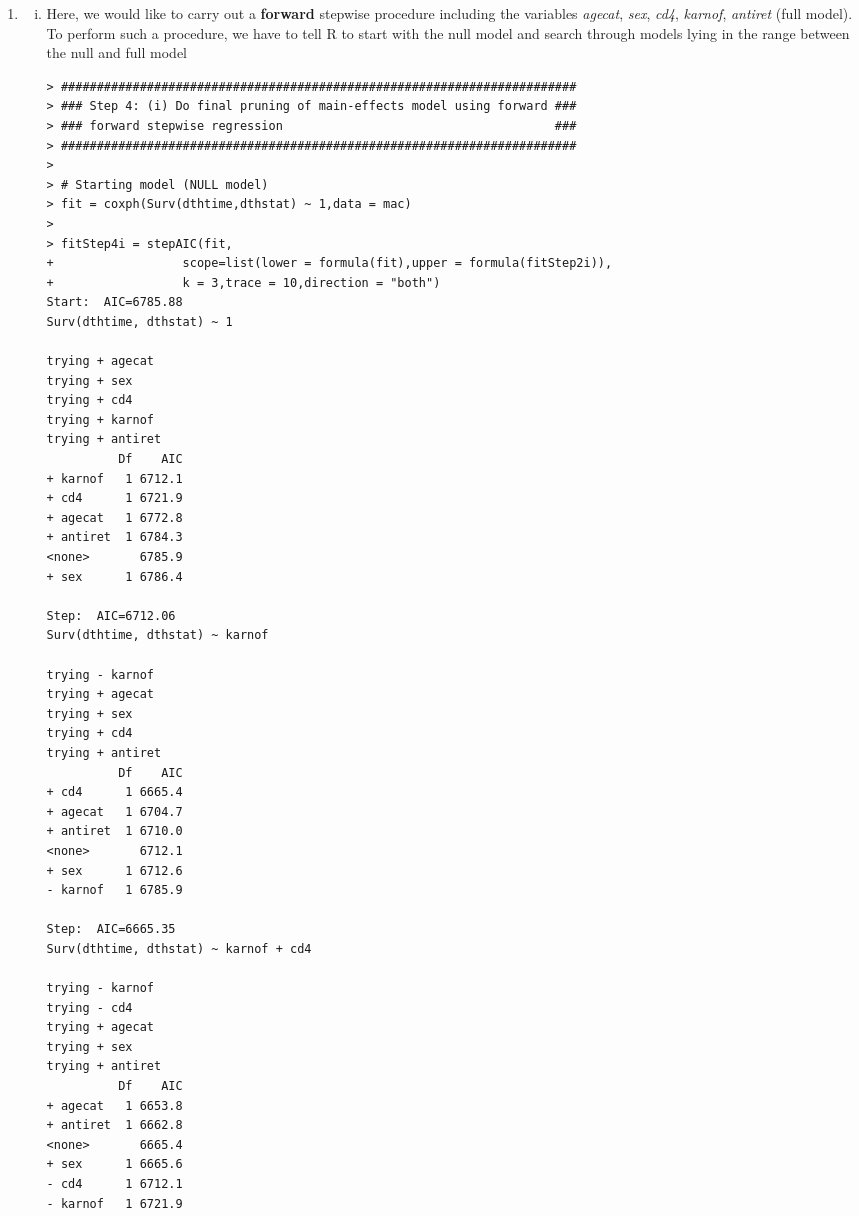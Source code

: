 \begin{enumerate}[(a)]
\begin{enumerate}[Step 1:]
\begin{spacing}{1.2}
\begin{footnotesize}
\begin{verbatim}
trying + ivdrug
trying + trt
         Df    AIC
<none>      6650.9
+ ivdrug  1 6653.5
+ trt     2 6656.3
\end{verbatim}
\end{footnotesize}
\end{spacing}
There is no variable added in the model.
\item \begin{enumerate}[(i)]
\item Here, we would like to carry out a \textbf{forward} stepwise procedure including the variables \emph{agecat}, \emph{sex}, \emph{cd4}, \emph{karnof}, \emph{antiret} (full model). To perform such a procedure, we have to tell R to start with the null model and search through models lying in the
range between the null and full model
\begin{spacing}{1.2}
\begin{footnotesize}
\begin{verbatim}
> ########################################################################
> ### Step 4: (i) Do final pruning of main-effects model using forward ###        
> ### forward stepwise regression                                      ###                           
> ########################################################################
> 
> # Starting model (NULL model)
> fit = coxph(Surv(dthtime,dthstat) ~ 1,data = mac)
> 
> fitStep4i = stepAIC(fit,
+                  scope=list(lower = formula(fit),upper = formula(fitStep2i)),
+                  k = 3,trace = 10,direction = "both")
Start:  AIC=6785.88
Surv(dthtime, dthstat) ~ 1

trying + agecat
trying + sex
trying + cd4
trying + karnof
trying + antiret
          Df    AIC
+ karnof   1 6712.1
+ cd4      1 6721.9
+ agecat   1 6772.8
+ antiret  1 6784.3
<none>       6785.9
+ sex      1 6786.4

Step:  AIC=6712.06
Surv(dthtime, dthstat) ~ karnof

trying - karnof
trying + agecat
trying + sex
trying + cd4
trying + antiret
          Df    AIC
+ cd4      1 6665.4
+ agecat   1 6704.7
+ antiret  1 6710.0
<none>       6712.1
+ sex      1 6712.6
- karnof   1 6785.9

Step:  AIC=6665.35
Surv(dthtime, dthstat) ~ karnof + cd4

trying - karnof
trying - cd4
trying + agecat
trying + sex
trying + antiret
          Df    AIC
+ agecat   1 6653.8
+ antiret  1 6662.8
<none>       6665.4
+ sex      1 6665.6
- cd4      1 6712.1
- karnof   1 6721.9


\end{verbatim}
\end{footnotesize}
\end{spacing}
\end{enumerate}
\end{enumerate}
\end{enumerate}
